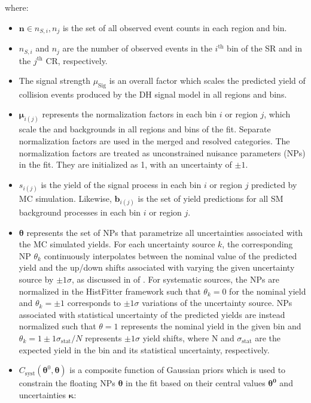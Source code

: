 where:

\begin{itemize}
    \item \(\boldsymbol{n}\in{n_{S,i}, n_j}\) is the set of all observed event counts in each region and bin.
    \item \(n_{S,i}\) and \(n_j\) are the number of observed events in the \(i^\text{th}\) bin of the SR and in the \(j^\text{th}\) CR, respectively.
    \item The signal strength \(\mu_\text{Sig}\) is an overall factor which scales the predicted yield of collision events produced by the DH signal model in all regions and bins.
    \item \(\boldsymbol{\mu}_{i(j)}\) represents the normalization factors in each bin \(i\) or region \(j\), which scale the \wjets and \ttbar backgrounds in all regions and bins of the fit. Separate normalization factors are used in the merged and resolved categories. The normalization factors are treated as unconstrained nuisance parameters (NPs) in the fit. They are initialized as 1, with an uncertainty of \(\pm1\).  
    \item \(s_{i(j)}\) is the yield of the signal process in each bin \(i\) or region \(j\) predicted by MC simulation. Likewise, \(\boldsymbol{b}_{i(j)}\) is the set of yield predictions for all SM background processes  in each bin \(i\) or region \(j\).
    \item \(\boldsymbol{\theta}\) represents the set of NPs that parametrize all uncertainties associated with the MC simulated yields. For each uncertainty source \(k\), the corresponding NP \(\theta_k\) continuously interpolates between the nominal value of the predicted yield and the up/down shifts associated with varying the given uncertainty source by \(\pm1\sigma\), as discussed in  of . For systematic sources, the NPs are normalized in the HistFitter framework such that \(\theta_k=0\) for the nominal yield and \(\theta_k=\pm1\) corresponds to \(\pm1\sigma\) variations of the uncertainty source. NPs associated with statistical uncertainty of the predicted yields are instead normalized such that \(\theta=1\) represents the nominal yield in the given bin and \(\theta_k=1\pm1\sigma_\text{stat}/N\) represents \(\pm1\sigma\) yield shifts, where N and \(\sigma_\text{stat}\) are the expected yield in the bin and its statistical uncertainty, respectively. 
    \item \(C_\text{syst}(\boldsymbol{\theta}^0, \boldsymbol{\theta})\) is a composite function of Gaussian priors which is used to constrain the floating NPs \(\boldsymbol{\theta}\) in the fit based on their central values \(\boldsymbol{\theta^0}\) and uncertainties \(\boldsymbol{\kappa}\):


\end{itemize}
